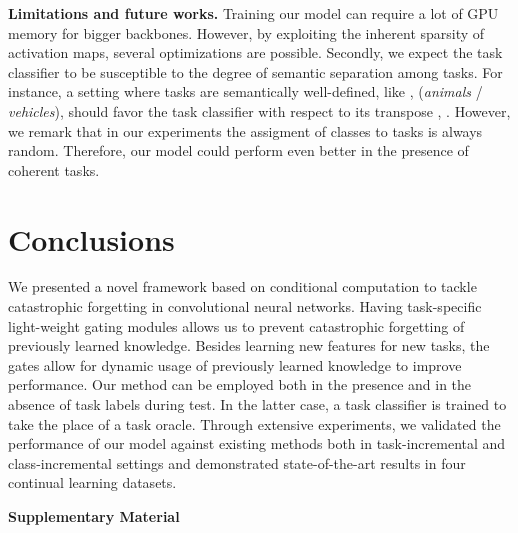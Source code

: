 \documentclass[10pt,twocolumn,letterpaper]{article}
\begin{document}
\textbf{Limitations and future works.}
Training our model can require a lot of GPU memory for bigger backbones.
However, by exploiting the inherent sparsity of activation maps, several optimizations are possible.
Secondly, we expect the task classifier to be susceptible to the degree of semantic separation among tasks.
For instance, a setting where tasks are semantically well-defined, like ,  (\textit{animals} / \textit{vehicles}), should favor the task classifier with respect to its transpose , . However, we remark that in our experiments the assigment of classes to tasks is always random. Therefore, our model could perform even better in the presence of coherent tasks. \section{Conclusions}
We presented a novel framework based on conditional computation to tackle catastrophic forgetting in convolutional neural networks.
Having task-specific light-weight gating modules allows us to prevent catastrophic forgetting of previously learned knowledge.
Besides learning new features for new tasks, the gates allow for dynamic usage of previously learned knowledge to improve performance.
Our method can be employed both in the presence and in the absence of task labels during test.
In the latter case, a task classifier is trained to take the place of a task oracle.
Through extensive experiments, we validated the performance of our model against existing methods both in task-incremental and class-incremental settings and demonstrated state-of-the-art results in four continual learning datasets. \clearpage
{\small
\balance


}
\clearpage
\Large{\textbf{Supplementary Material}}
\normalsize
\setcounter{section}{0}
\end{document}
